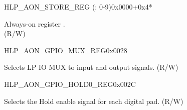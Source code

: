 \begin{register}{H}{LP\_AON\_STORE\_REG (: 0-9)}{0x0000+0x4*}\label{regdesc:LPAONSTORENREG}
%
\regnewline%
\begin{regdesc}\begin{reglist}
\label{fielddesc:LPAONSTOREN}\item [LP\_AON\_STORE\regindex{n}] Always-on register . \\(R/W)
\end{reglist}\end{regdesc}
\end{register}


\begin{register}{H}{LP\_AON\_GPIO\_MUX\_REG}{0x0028}\label{regdesc:LPAONGPIOMUXREG}
%
%
\regnewline%
\begin{regdesc}\begin{reglist}
\label{fielddesc:LPAONGPIOMUXSEL}\item [LP\_AON\_GPIO\_MUX\_SEL] Selects LP IO MUX to input and output signals. (R/W)
\end{reglist}\end{regdesc}
\end{register}


\begin{register}{H}{LP\_AON\_GPIO\_HOLD0\_REG}{0x002C}\label{regdesc:LPAONGPIOHOLD0REG}
%
\regnewline%
\begin{regdesc}\begin{reglist}
\label{fielddesc:LPAONGPIOHOLD0}\item [LP\_AON\_GPIO\_HOLD0] Selects the Hold enable signal for each digital pad. (R/W)
\end{reglist}\end{regdesc}
\end{register}


